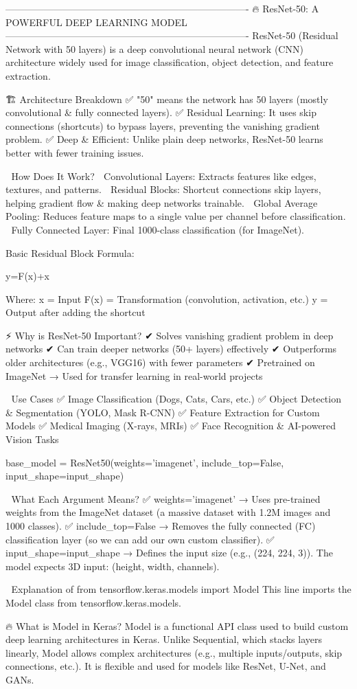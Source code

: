 ----------------------------------------------------------------------------
🔥 ResNet-50: A POWERFUL DEEP LEARNING MODEL
----------------------------------------------------------------------------
ResNet-50 (Residual Network with 50 layers) is a deep convolutional neural network (CNN) architecture widely used for image classification, object detection, and feature extraction.

🏗 Architecture Breakdown
✅ "50" means the network has 50 layers (mostly convolutional & fully connected layers).
✅ Residual Learning: It uses skip connections (shortcuts) to bypass layers, preventing the vanishing gradient problem.
✅ Deep & Efficient: Unlike plain deep networks, ResNet-50 learns better with fewer training issues.

🔄 How Does It Work?
🔷 Convolutional Layers: Extracts features like edges, textures, and patterns.
🔷 Residual Blocks: Shortcut connections skip layers, helping gradient flow & making deep networks trainable.
🔷 Global Average Pooling: Reduces feature maps to a single value per channel before classification.
🔷 Fully Connected Layer: Final 1000-class classification (for ImageNet).

Basic Residual Block Formula:

y=F(x)+x

Where:
x = Input
F(x) = Transformation (convolution, activation, etc.)
y = Output after adding the shortcut

⚡ Why is ResNet-50 Important?
✔ Solves vanishing gradient problem in deep networks
✔ Can train deeper networks (50+ layers) effectively
✔ Outperforms older architectures (e.g., VGG16) with fewer parameters
✔ Pretrained on ImageNet → Used for transfer learning in real-world projects

🎯 Use Cases
✅ Image Classification (Dogs, Cats, Cars, etc.)
✅ Object Detection & Segmentation (YOLO, Mask R-CNN)
✅ Feature Extraction for Custom Models
✅ Medical Imaging (X-rays, MRIs)
✅ Face Recognition & AI-powered Vision Tasks

base_model = ResNet50(weights='imagenet', include_top=False, input_shape=input_shape)

📌 What Each Argument Means?
✅ weights='imagenet' → Uses pre-trained weights from the ImageNet dataset (a massive dataset with 1.2M images and 1000 classes).
✅ include_top=False → Removes the fully connected (FC) classification layer (so we can add our own custom classifier).
✅ input_shape=input_shape → Defines the input size (e.g., (224, 224, 3)). The model expects 3D input: (height, width, channels).


📌 Explanation of from tensorflow.keras.models import Model
This line imports the Model class from tensorflow.keras.models.

🔥 What is Model in Keras?
Model is a functional API class used to build custom deep learning architectures in Keras.
Unlike Sequential, which stacks layers linearly, Model allows complex architectures (e.g., multiple inputs/outputs, skip connections, etc.).
It is flexible and used for models like ResNet, U-Net, and GANs.
